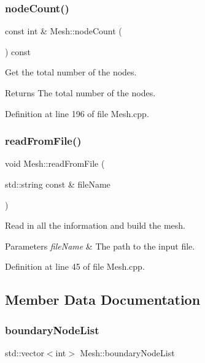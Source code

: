 \subsubsection{\texorpdfstring{node\+Count()}{nodeCount()}}
{\footnotesize\ttfamily const int \& Mesh\+::node\+Count (\begin{DoxyParamCaption}{ }\end{DoxyParamCaption}) const}



Get the total number of the nodes. 

\begin{DoxyReturn}{Returns}
The total number of the nodes. 
\end{DoxyReturn}


Definition at line 196 of file Mesh.\+cpp.

\mbox{\label{class_mesh_a519813e103dbb3fb1739a2c40b3e1153}} 
\subsubsection{\texorpdfstring{read\+From\+File()}{readFromFile()}}
{\footnotesize\ttfamily void Mesh\+::read\+From\+File (\begin{DoxyParamCaption}\item[{std\+::string const \&}]{file\+Name }\end{DoxyParamCaption})}



Read in all the information and build the mesh. 


\begin{DoxyParams}{Parameters}
{\em file\+Name} & The path to the input file. \\
\hline
\end{DoxyParams}


Definition at line 45 of file Mesh.\+cpp.



\subsection{Member Data Documentation}
\mbox{\label{class_mesh_a5a1c5739ef85c8f9071f689e790b5251}} 
\subsubsection{\texorpdfstring{boundary\+Node\+List}{boundaryNodeList}}
{\footnotesize\ttfamily std\+::vector$<$int$>$ Mesh\+::boundary\+Node\+List}



